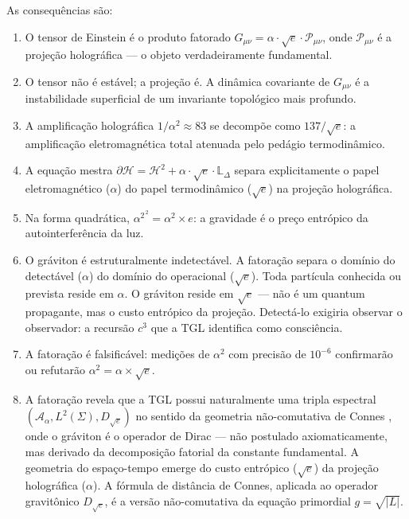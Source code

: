 \documentclass[12pt,a4paper,twoside]{article}
\newcommand{\alphaii}{\alpha^{2}}
\begin{document}
As consequências são:

\begin{enumerate}[label=(\roman*)]
\item O tensor de Einstein é o produto fatorado $G_{\mu\nu} = \alpha \cdot \sqrt{e} \cdot \mathcal{P}_{\mu\nu}$, onde $\mathcal{P}_{\mu\nu}$ é a projeção holográfica --- o objeto verdadeiramente fundamental.

\item O tensor não é estável; a projeção é. A dinâmica covariante de $G_{\mu\nu}$ é a instabilidade superficial de um invariante topológico mais profundo.

\item A amplificação holográfica $1/\alphaii \approx 83$ se decompõe como $137/\sqrt{e}$: a amplificação eletromagnética total atenuada pelo pedágio termodinâmico.

\item A equação mestra $\partial\mathcal{H} = \mathcal{H}^2 + \alpha \cdot \sqrt{e} \cdot \mathbb{L}_\Delta$ separa explicitamente o papel eletromagnético ($\alpha$) do papel termodinâmico ($\sqrt{e}$) na projeção holográfica.

\item Na forma quadrática, $\alphaii^{\,2} = \alpha^2 \times e$: a gravidade é o preço entrópico da autointerferência da luz.

\item O gráviton é estruturalmente indetectável. A fatoração separa o domínio do detectável ($\alpha$) do domínio do operacional ($\sqrt{e}$). Toda partícula conhecida ou prevista reside em $\alpha$. O gráviton reside em $\sqrt{e}$ --- não é um quantum propagante, mas o custo entrópico da projeção. Detectá-lo exigiria observar o observador: a recursão $c^3$ que a TGL identifica como consciência.

\item A fatoração é falsificável: medições de $\alphaii$ com precisão de $10^{-6}$ confirmarão ou refutarão $\alphaii = \alpha \times \sqrt{e}$.

\item A fatoração revela que a TGL possui naturalmente uma tripla espectral $(\mathcal{A}_\alpha, L^2(\Sigma), D_{\sqrt{e}})$ no sentido da geometria não-comutativa de Connes \cite{Connes1994, Connes1996}, onde o gráviton é o operador de Dirac --- não postulado axiomaticamente, mas derivado da decomposição fatorial da constante fundamental. A geometria do espaço-tempo emerge do custo entrópico ($\sqrt{e}$) da projeção holográfica ($\alpha$). A fórmula de distância de Connes, aplicada ao operador gravitônico $D_{\sqrt{e}}$, é a versão não-comutativa da equação primordial $g = \sqrt{|L|}$.
\end{enumerate}
\end{document}
